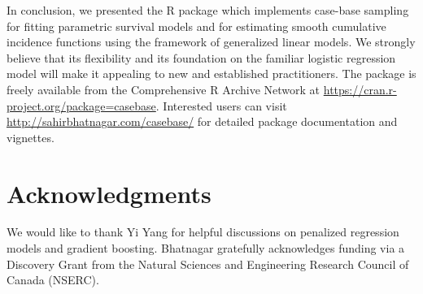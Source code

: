 In conclusion, we presented the \textsf{R} package  which
implements case-base sampling for fitting parametric survival models and
for estimating smooth cumulative incidence functions using the framework
of generalized linear models. We strongly believe that its flexibility
and its foundation on the familiar logistic regression model will make
it appealing to new and established practitioners. The 
package is freely available from the Comprehensive \textsf{R} Archive
Network at \url{https://cran.r-project.org/package=casebase}. Interested
users can visit \url{http://sahirbhatnagar.com/casebase/} for detailed
package documentation and vignettes.

\hypertarget{acknowledgments}{%
\section*{Acknowledgments}\label{acknowledgments}}

We would like to thank Yi Yang for helpful discussions on penalized
regression models and gradient boosting. \mbox{Bhatnagar} gratefully
acknowledges funding via a Discovery Grant from the Natural Sciences and
Engineering Research Council of Canada (NSERC).



\address{%
Sahir Rai Bhatnagar*\\
McGill University\\%
1020 Pine Avenue West Montreal, QC, Canada H3A 1A2\\
%
\url{http://sahirbhatnagar.com/}%
%
\\
}

\address{%
Maxime Turgeon*\\
University of Manitoba\\%
186 Dysart Road Winnipeg, MB, Canada R3T 2N2\\
%
\url{https://maxturgeon.ca/}%
%
\\
}

\address{%
Jesse Islam\\
McGill University\\%
1020 Pine Avenue West Montreal, QC, Canada H3A 1A2\\
%
%
%
\\
}

\address{%
James A. Hanley\\
McGill University\\%
1020 Pine Avenue West Montreal, QC, Canada H3A 1A2\\
%
\url{http://www.medicine.mcgill.ca/epidemiology/hanley/}%
%
\\
}

\address{%
Olli Saarela\\
University of Toronto\\%
Dalla Lana School of Public Health, 155 College Street, 6th floor,
Toronto, Ontario M5T 3M7, Canada\\
%
\url{http://individual.utoronto.ca/osaarela/}%
%
\\
}
